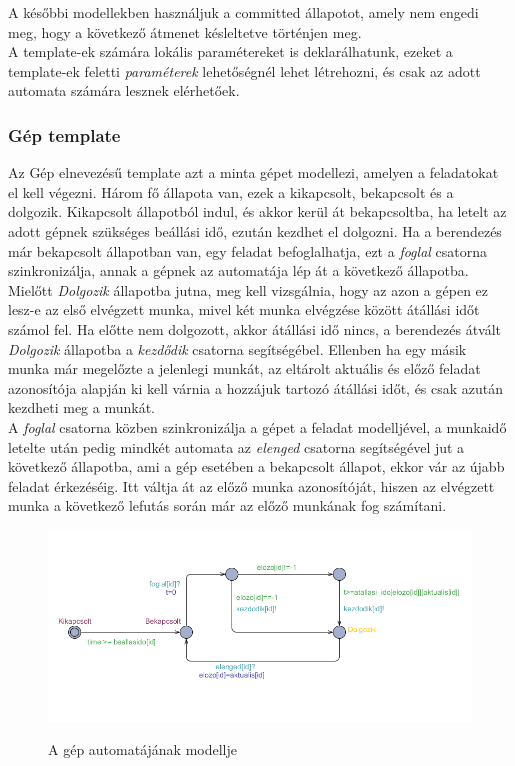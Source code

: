 \documentclass [12pt]{report}
\begin{document}
    A későbbi modellekben használjuk a committed állapotot, amely nem engedi meg, hogy a következő átmenet késleltetve történjen meg.\\
    A template-ek számára lokális paramétereket is deklarálhatunk, ezeket a template-ek feletti \emph{paraméterek} lehetőségnél lehet létrehozni, és csak az adott automata számára lesznek elérhetőek. \\
    
    \subsubsection*{Gép template}
    Az Gép elnevezésű template azt a minta gépet modellezi, amelyen a feladatokat el kell végezni. Három fő állapota van, ezek a kikapcsolt, bekapcsolt és a dolgozik. Kikapcsolt állapotból indul, és akkor kerül át bekapcsoltba, ha letelt az adott gépnek szükséges beállási idő, ezután kezdhet el dolgozni.  Ha a berendezés már bekapcsolt állapotban van, egy feladat befoglalhatja, ezt a \emph{foglal} csatorna szinkronizálja, annak a gépnek az automatája lép át a következő állapotba. Mielőtt \emph{Dolgozik} állapotba jutna, meg kell vizsgálnia, hogy az azon a gépen ez lesz-e az első elvégzett munka, mivel két munka elvégzése között átállási időt számol fel. Ha előtte nem dolgozott, akkor átállási idő nincs, a berendezés átvált \emph{Dolgozik} állapotba a \emph{kezdődik} csatorna segítségébel. Ellenben ha egy másik munka már megelőzte a jelenlegi munkát, az eltárolt aktuális és előző feladat azonosítója alapján ki kell várnia a hozzájuk tartozó átállási időt, és csak azután kezdheti meg a munkát. \\
    A \emph{foglal} csatorna közben szinkronizálja a gépet a feladat modelljével, a munkaidő letelte után pedig mindkét automata az \emph{elenged} csatorna segítségével jut a következő állapotba, ami a gép esetében a bekapcsolt állapot, ekkor vár az újabb feladat érkezéséig. Itt váltja át az előző munka azonosítóját, hiszen az elvégzett munka a következő lefutás során már az előző munkának fog számítani. 
    \begin{figure}[htpb]
    \begin{center}
   \includegraphics[width=12cm]{gep}\\
    \caption{A gép automatájának modellje}
    \end{center}
    \end{figure}\\
\end{document}
